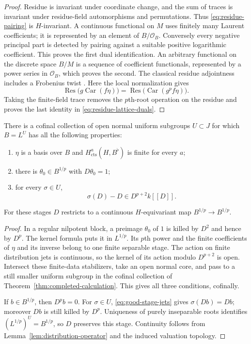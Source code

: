 \begin{proof}
Residue is invariant under coordinate change, and the sum of traces
is invariant under residue-field automorphisms and permutations.
Thus \eqref{eq:residue-pairing} is $H$-invariant.  A continuous
functional on $M$ uses finitely many Laurent coefficients; it is
represented by an element of $B/\mathcal O_B$.  Conversely every
negative principal part is detected by pairing against a suitable
positive logarithmic coefficient.  This proves the first dual
identification.  An arbitrary functional on the discrete space
$B/M$ is a sequence of coefficient functionals, represented by a
power series in $\mathcal O_B$, which proves the second.  The classical
residue adjointness includes a Frobenius twist
\citep[Section~10, Proposition~9]{Serre58Topology}.  Here the local
normalization gives
\[
 \operatorname{Res}\bigl(g\operatorname{Car}(f\eta)\bigr)
 =\operatorname{Res}\bigl(\operatorname{Car}(g^pf\eta)\bigr).
\]
Taking the finite-field trace removes the $p$th-root operation on
the residue and proves the last identity in
\eqref{eq:residue-lattice-duals}.
\end{proof}

\begin{lemma}
\label{lem:good-stages}
There is a cofinal collection of open normal uniform subgroups
$U\subset J$ for which $B=L^U$ has all the following properties:
\begin{enumerate}
\item $\eta$ is a basis over $B$ and $H^a_{\mathrm{cts}}(H,B^\flat)$
is finite for every $a$;
\item there is $\theta_0\in B^{1/p}$ with $D\theta_0=1$;
\item for every $\sigma\in U$,
\begin{equation}
 \label{eq:good-stage-jets}
 \sigma(D)-D\in D^{p+2}k[[D]].
\end{equation}
\end{enumerate}
For these stages $D$ restricts to a continuous $H$-equivariant map
$B^{1/p}\to B^{1/p}$.
\end{lemma}

\begin{proof}
In a regular nilpotent block, a preimage $\theta_0$ of $1$ is killed
by $D^2$ and hence by $D^p$.  The kernel formula puts it in
$L^{1/p}$.  Its $p$th power and the finite coefficients of $\eta$
and its inverse belong to one finite separable stage.  The action on
finite distribution jets is continuous, so the kernel of its action
modulo $D^{p+2}$ is open.  Intersect these finite-data stabilizers,
take an open normal core, and pass to a still smaller uniform subgroup
in the cofinal collection of
Theorem~\ref{thm:completed-calculation}.  This gives all three
conditions, cofinally.

If $b\in B^{1/p}$, then $D^pb=0$.  For $\sigma\in U$,
\eqref{eq:good-stage-jets} gives $\sigma(Db)=Db$; moreover $Db$ is
still killed by $D^p$.  Uniqueness of purely inseparable roots
identifies $(L^{1/p})^U=B^{1/p}$, so $D$ preserves this stage.
Continuity follows from Lemma~\ref{lem:distribution-operator} and
the induced valuation topology.
\end{proof}

